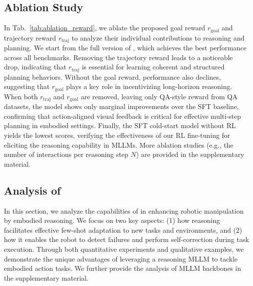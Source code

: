 \subsection{Ablation Study}
In Tab.~\ref{tab:ablation_reward}, we ablate the proposed goal reward $r_\text{goal}$ and trajectory reward $r_\text{traj}$ to analyze their individual contributions to reasoning and planning. We start from the full version of \ours{}, which achieves the best performance across all benchmarks. Removing the trajectory reward leads to a noticeable drop, indicating that $r_\text{traj}$ is essential for learning coherent and structured planning behaviors. Without the goal reward, performance also declines, suggesting that $r_\text{goal}$ plays a key role in incentivizing long-horizon reasoning. When both $r_\text{traj}$ and $r_\text{goal}$ are removed, leaving only QA-style reward from QA datasets, the model shows only marginal improvements over the SFT baseline, confirming that action-aligned visual feedback is critical for effective multi-step planning in embodied settings. Finally, the SFT cold-start model without RL yields the lowest scores, verifying the effectiveness of our RL fine-tuning for eliciting the reasoning capability in MLLMs. More ablation studies (e.g., the number of interactions per reasoning step $N$) are provided in the supplementary material.


\subsection{Analysis of \ours{}}

In this section, we analyze the capabilities of \ours{} in enhancing robotic manipulation by embodied reasoning. We focus on two key aspects: (1) how reasoning facilitates effective few-shot adaptation to new tasks and environments, and (2) how it enables the robot to detect failures and perform self-correction during task execution. Through both quantitative experiments and qualitative examples, we demonstrate the unique advantages of leveraging a reasoning MLLM to tackle embodied action tasks. We further provide the analysis of MLLM backbones in the supplementary material.




